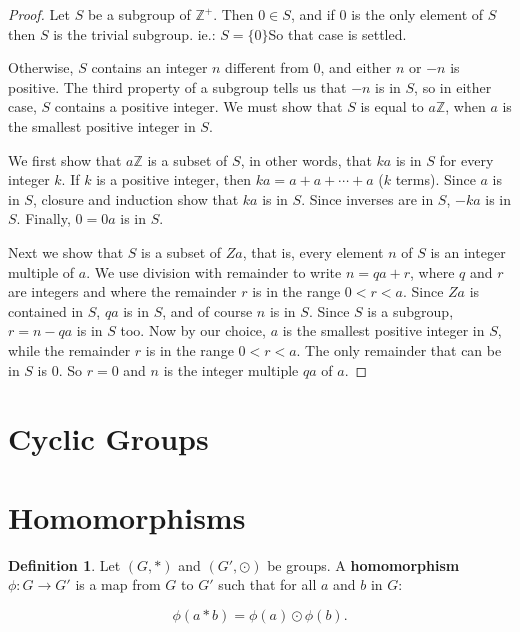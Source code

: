 \documentclass[
]{book}
\theoremstyle{definition}
\newtheorem{definition}{Definition}[chapter]
\theoremstyle{definition}
\theoremstyle{definition}
\theoremstyle{definition}
\theoremstyle{remark}
\begin{document}
\begin{proof}
Let \(S\) be a subgroup of \(\mathbb{Z}^+\). Then \(0\in S\), and if \(0\) is the only element of \(S\) then \(S\) is the trivial subgroup. ie.: \(S=\{0\}\)So that case is settled.

Otherwise, \(S\) contains an integer \(n\) different from \(0\), and either \(n\) or \(-n\) is positive. The third property of a subgroup tells us that \(-n\) is in \(S\), so in either case, \(S\) contains a positive integer. We must show that \(S\) is equal to \(a\mathbb{Z}\), when \(a\) is the smallest positive integer in \(S\).

We first show that \(a\mathbb{Z}\) is a subset of \(S\), in other words, that \(ka\) is in \(S\) for every integer \(k\). If \(k\) is a positive integer, then \(ka = a + a + \cdots + a\) (\(k\) terms). Since \(a\) is in \(S\), closure and induction show that \(ka\) is in \(S\). Since inverses are in \(S\), \(-ka\) is in \(S\). Finally, \(0 = 0a\) is in \(S\).

Next we show that \(S\) is a subset of \(Za\), that is, every element \(n\) of \(S\) is an integer multiple of \(a\). We use division with remainder to write \(n = qa + r\), where \(q\) and \(r\) are integers and where the remainder \(r\) is in the range \(0 < r < a\). Since \(Za\) is contained in \(S\), \(qa\) is in \(S\), and of course \(n\) is in \(S\). Since \(S\) is a subgroup, \(r = n - qa\) is in \(S\) too. Now by our choice, \(a\) is the smallest positive integer in \(S\), while the remainder \(r\) is in the range \(0 < r < a\). The only remainder that can be in \(S\) is \(0\). So \(r = 0\) and \(n\) is the integer multiple \(qa\) of \(a\).
\end{proof}

\hypertarget{cyclic-groups}{%
\section{Cyclic Groups}\label{cyclic-groups}}

\hypertarget{homomorphisms}{%
\section{Homomorphisms}\label{homomorphisms}}

\begin{definition}
\protect\hypertarget{def:unnamed-chunk-23}{}\label{def:unnamed-chunk-23}Let \((G, *)\) and \((G', \odot)\) be groups. A \textbf{homomorphism} \(\phi: G \rightarrow G'\) is a map from \(G\) to \(G'\) such that for all \(a\) and \(b\) in \(G\):

\begin{equation}
    \phi(a * b) = \phi(a) \odot \phi(b).
\end{equation}
\end{definition}
\end{document}
